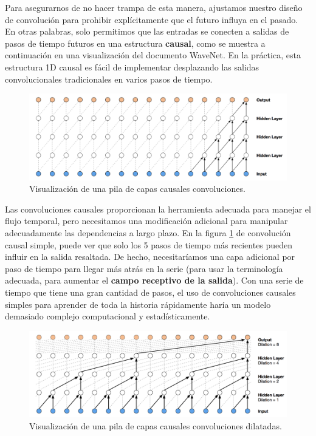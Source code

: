 \documentclass[a4paper,12pt]{article}
\begin{document}
Para asegurarnos de no hacer trampa de esta manera, ajustamos nuestro diseño de convolución para prohibir explícitamente que el futuro influya en el pasado. En otras palabras, solo permitimos que las entradas se conecten a salidas de pasos de tiempo futuros en una estructura \textbf{causal}, como se muestra a continuación en una visualización del documento WaveNet. En la práctica, esta estructura 1D causal es fácil de implementar desplazando las salidas convolucionales tradicionales en varios pasos de tiempo.

\begin{figure}[H]
	\begin{center}				
		\includegraphics[width=1\textwidth]{stackcausal-conv.png}
		\caption{Visualización de una pila de capas causales convoluciones. \citep{wavenet2}}
		\label{fig:stackcausal-conv}
	\end{center}
\end{figure}

Las convoluciones causales proporcionan la herramienta adecuada para manejar el flujo temporal, pero necesitamos una modificación adicional para manipular adecuadamente las dependencias a largo plazo. En la figura \ref{fig:stackcausal-conv} de convolución causal simple, puede ver que solo los 5 pasos de tiempo más recientes pueden influir en la salida resaltada. De hecho, necesitaríamos una capa adicional por paso de tiempo para llegar más atrás en la serie (para usar la terminología adecuada, para aumentar el \textbf{campo receptivo de la salida}). Con una serie de tiempo que tiene una gran cantidad de pasos, el uso de convoluciones causales simples para aprender de toda la historia rápidamente haría un modelo demasiado complejo computacional y estadísticamente.

\begin{figure}[H]
	\begin{center}				
		\includegraphics[width=1\textwidth]{dilated-conv.png}
		\caption{Visualización de una pila de capas causales convoluciones dilatadas. \citep{wavenet2}}
		\label{fig:dilated-conv}
	\end{center}
\end{figure}
\end{document}
